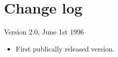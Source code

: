 \chapter{Change log}
%
\setfooter{\thepage}{}{}{}{}{\thepage}

Version 2.0, June 1st 1996

\begin{itemize}\itemsep=0pt
\item First publically released version.
\end{itemize}
